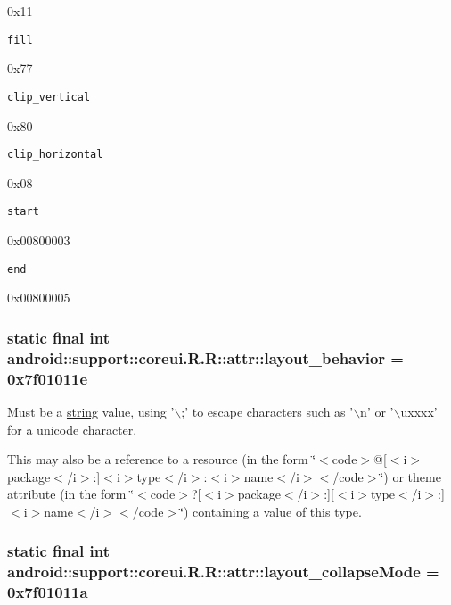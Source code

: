 0x11

{\tt fill}

0x77

{\tt clip\_\-vertical}

0x80

{\tt clip\_\-horizontal}

0x08

{\tt start}

0x00800003

{\tt end}

0x00800005\hypertarget{classandroid_1_1support_1_1coreui_1_1_r_1_1attr_66e788d99389289be132077900665877}{
\subsubsection[{layout\_\-behavior}]{\setlength{\rightskip}{0pt plus 5cm}static final int android::support::coreui.R.R::attr::layout\_\-behavior = 0x7f01011e}}
\label{classandroid_1_1support_1_1coreui_1_1_r_1_1attr_66e788d99389289be132077900665877}


Must be a \hyperlink{classandroid_1_1support_1_1coreui_1_1_r_1_1string}{string} value, using '$\backslash$;' to escape characters such as '$\backslash$n' or '$\backslash$uxxxx' for a unicode character. 

This may also be a reference to a resource (in the form \char`\"{}$<$code$>$@\mbox{[}$<$i$>$package$<$/i$>$:\mbox{]}$<$i$>$type$<$/i$>$:$<$i$>$name$<$/i$>$$<$/code$>$\char`\"{}) or theme attribute (in the form \char`\"{}$<$code$>$?\mbox{[}$<$i$>$package$<$/i$>$:\mbox{]}\mbox{[}$<$i$>$type$<$/i$>$:\mbox{]}$<$i$>$name$<$/i$>$$<$/code$>$\char`\"{}) containing a value of this type. \hypertarget{classandroid_1_1support_1_1coreui_1_1_r_1_1attr_8f9a9a0197028615d2bf326cbd722be4}{
\subsubsection[{layout\_\-collapseMode}]{\setlength{\rightskip}{0pt plus 5cm}static final int android::support::coreui.R.R::attr::layout\_\-collapseMode = 0x7f01011a}}
\label{classandroid_1_1support_1_1coreui_1_1_r_1_1attr_8f9a9a0197028615d2bf326cbd722be4}


